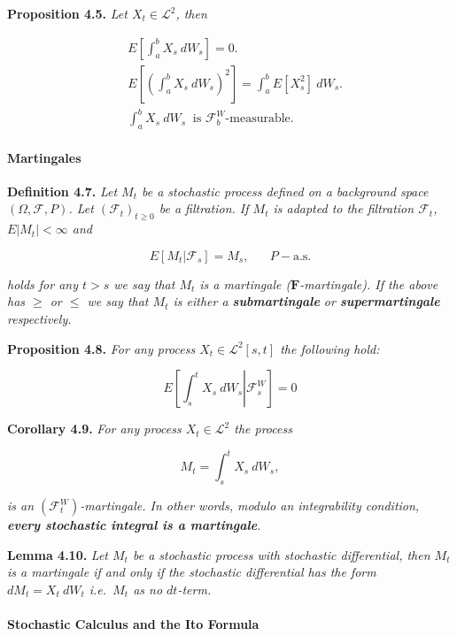 \documentclass[
]{article}
\begin{document}
\textbf{Proposition 4.5.} \emph{Let \(X_t\in\mathcal{L}^2\), then}

\begin{align*}
&E\left[\int_a^b X_s\ dW_s\right]=0.\tag{4.12}\\
&E\left[\left(\int_a^b X_s\ dW_s\right)^2\right]=\int_a^b E[ X_s^2]\ dW_s.\tag{4.13}\\
&\int_a^b X_s\ dW_s\ \text{ is }\mathcal{F}_b^W\text{-measurable.}\tag{4.14}
\end{align*}

\hypertarget{martingales}{%
\paragraph{Martingales}\label{martingales}}

\textbf{Definition 4.7.} \emph{Let \(M_t\) be a stochastic process
defined on a background space \((\Omega,\mathcal{F},P)\). Let
\((\mathcal{F}_t)_{t\ge 0}\) be a filtration. If \(M_t\) is adapted to
the filtration \(\mathcal{F}_t\), \(E\vert M_t\vert <\infty\) and}

\[E[M_t\vert \mathcal{F}_s]=M_s,\hspace{20pt}P-\text{a.s.}\]

\emph{holds for any \(t>s\) we say that \(M_t\) is a martingale
(\(\mathbf{F}\)-martingale). If the above has \(\ge\) or \(\le\) we say
that \(M_t\) is either a \textbf{submartingale} or
\textbf{supermartingale} respectively.}

\textbf{Proposition 4.8.} \emph{For any process
\(X_t\in\mathcal{L}^2[s,t]\) the following hold:}

\[
E\left[\left.\int_s^t X_s\ dW_s\right\vert\mathcal{F}_s^W\right]=0
\]

\textbf{Corollary 4.9.} \emph{For any process \(X_t\in\mathcal{L}^2\)
the process}

\[
M_t=\int_s^t X_s\ dW_s,
\]

\emph{is an \((\mathcal{F}_t^W)\)-martingale. In other words, modulo an
integrability condition, \textbf{every stochastic integral is a
martingale}.}

\textbf{Lemma 4.10.} \emph{Let \(M_t\) be a stochastic process with
stochastic differential, then \(M_t\) is a martingale if and only if the
stochastic differential has the form \(dM_t=X_t\ dW_t\) i.e.~\(M_t\) as
no \(dt\)-term.}

\hypertarget{stochastic-calculus-and-the-ito-formula}{%
\paragraph{Stochastic Calculus and the Ito
Formula}\label{stochastic-calculus-and-the-ito-formula}}
\end{document}
